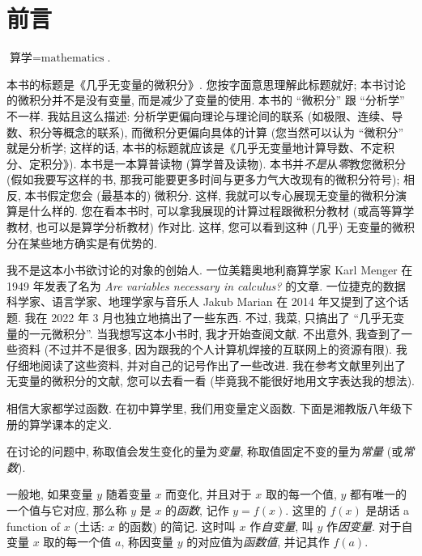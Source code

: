 \chapter*{前言}

\begin{definition*}
    $\text{算学} = \text{mathematics}$.
\end{definition*}

本书的标题是《几乎无变量的微积分》. 您按字面意思理解此标题就好; 本书讨论的微积分并不是没有变量, 而是减少了变量的使用. 本书的 ``微积分'' 跟 ``分析学'' 不一样. 我姑且这么描述: 分析学更偏向理论与理论间的联系 (如极限、连续、导数、积分等概念的联系), 而微积分更偏向具体的计算 (您当然可以认为 ``微积分'' 就是分析学; 这样的话, 本书的标题就应该是《几乎无变量地计算导数、不定积分、定积分》). 本书是一本算普读物 (算学普及读物). 本书并\emph{不是}从\emph{零}教您微积分 (假如我要写这样的书, 那我可能要更多时间与更多力气大改现有的微积分符号); 相反, 本书假定您会 (最基本的) 微积分. 这样, 我就可以专心展现无变量的微积分演算是什么样的. 您在看本书时, 可以拿我展现的计算过程跟微积分教材 (或高等算学教材, 也可以是算学分析教材) 作对比. 这样, 您可以看到这种 (几乎) 无变量的微积分在某些地方确实是有优势的.

我不是这本小书欲讨论的对象的创始人. 一位美籍奥地利裔算学家 Karl Menger 在 1949 年发表了名为 \textit{Are variables necessary in calculus?} 的文章. 一位捷克的数据科学家、语言学家、地理学家与音乐人 Jakub Marian 在 2014 年又提到了这个话题. 我在 2022 年 3 月也独立地搞出了一些东西. 不过, 我菜, 只搞出了 ``几乎无变量的一元微积分''. 当我想写这本小书时, 我才开始查阅文献. 不出意外, 我查到了一些资料 (不过并不是很多, 因为跟我的个人计算机焊接的互联网上的资源有限). 我仔细地阅读了这些资料, 并对自己的记号作出了一些改进. 我在参考文献里列出了无变量的微积分的文献, 您可以去看一看 (毕竟我不能很好地用文字表达我的想法).

相信大家都学过函数. 在初中算学里, 我们用变量定义函数. 下面是湘教版八年级下册的算学课本的定义.

\begin{definition*}
    在讨论的问题中, 称取值会发生变化的量为\emph{变量}, 称取值固定不变的量为\emph{常量} (或\emph{常数}).
\end{definition*}

\begin{definition*}
    一般地, 如果变量 $y$ 随着变量 $x$ 而变化, 并且对于 $x$ 取的每一个值, $y$ 都有唯一的一个值与它对应, 那么称 $y$ 是 $x$ 的\emph{函数}, 记作 $y = f(x)$. 这里的 $f(x)$ 是胡话 a function of $x$ (土话: $x$ 的函数) 的简记. 这时叫 $x$ 作\emph{自变量}, 叫 $y$ 作\emph{因变量}. 对于自变量 $x$ 取的每一个值 $a$, 称因变量 $y$ 的对应值为\emph{函数值}, 并记其作 $f(a)$.
\end{definition*}

